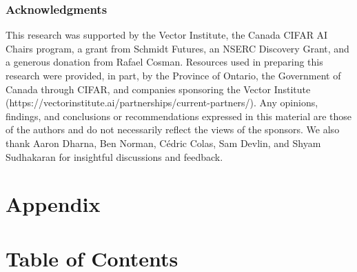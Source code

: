 \documentclass{article} %
\begin{document}
\newpage


\newpage


\subsubsection*{Acknowledgments}
This research was supported by the Vector Institute, the Canada CIFAR AI Chairs program, a grant from Schmidt Futures, an NSERC Discovery Grant, and a generous donation from Rafael Cosman. Resources used in preparing this research were provided, in part, by the Province of Ontario, the Government of Canada through CIFAR, and companies sponsoring the Vector Institute (https://vectorinstitute.ai/partnerships/current-partners/). Any opinions, findings, and conclusions or recommendations expressed in this material are those of the authors and do not necessarily reflect the views of the sponsors. We also thank Aaron Dharna, Ben Norman, Cédric Colas, Sam Devlin, and Shyam Sudhakaran for insightful discussions and feedback.




\clearpage
\appendix


\section*{\LARGE Appendix}

\section*{Table of Contents}

\startcontents[sections]
\end{document}
